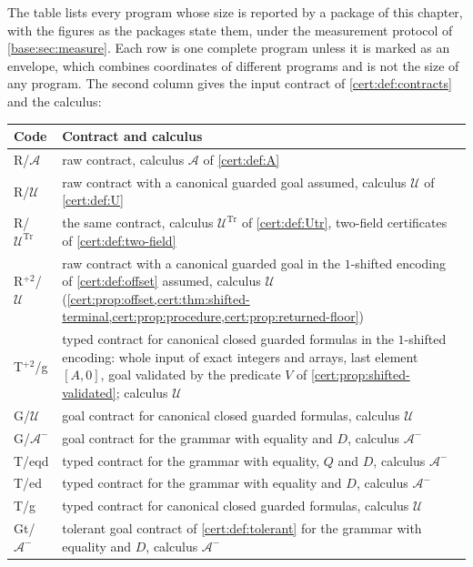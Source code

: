 The table lists every program whose size is reported by a package of this
chapter, with the figures as the packages state them, under the measurement
protocol of \cref{base:sec:measure}. Each row is one complete program unless
it is marked as an envelope, which combines coordinates of different
programs and is not the size of any program. The second column gives the
input contract of \cref{cert:def:contracts} and the calculus:
\begin{center}
\begin{tabular}{@{}lp{12.5cm}@{}}
\toprule
Code & Contract and calculus\\
\midrule
R/$\mathcal A$ & raw contract, calculus $\mathcal A$ of \cref{cert:def:A}\\
R/$\mathcal U$ & raw contract with a canonical guarded goal assumed, calculus $\mathcal U$ of \cref{cert:def:U}\\
R/$\mathcal U^{\mathrm{Tr}}$ & the same contract, calculus $\mathcal U^{\mathrm{Tr}}$ of \cref{cert:def:Utr}, two-field certificates of \cref{cert:def:two-field}\\
R$^{+2}$/$\mathcal U$ & raw contract with a canonical guarded goal in the $1$-shifted encoding of \cref{cert:def:offset} assumed, calculus $\mathcal U$ (\cref{cert:prop:offset,cert:thm:shifted-terminal,cert:prop:procedure,cert:prop:returned-floor})\\
T$^{+2}$/g & typed contract for canonical closed guarded formulas in the $1$-shifted encoding: whole input of exact integers and arrays, last element $[A,0]$, goal validated by the predicate $V$ of \cref{cert:prop:shifted-validated}; calculus $\mathcal U$\\
G/$\mathcal U$ & goal contract for canonical closed guarded formulas, calculus $\mathcal U$\\
G/$\mathcal A^{-}$ & goal contract for the grammar with equality and $D$, calculus $\mathcal A^{-}$\\
T/eqd & typed contract for the grammar with equality, $Q$ and $D$, calculus $\mathcal A^{-}$\\
T/ed & typed contract for the grammar with equality and $D$, calculus $\mathcal A^{-}$\\
T/g & typed contract for canonical closed guarded formulas, calculus $\mathcal U$\\
Gt/$\mathcal A^{-}$ & tolerant goal contract of \cref{cert:def:tolerant} for the grammar with equality and $D$, calculus $\mathcal A^{-}$\\

\end{tabular}
\end{center}
